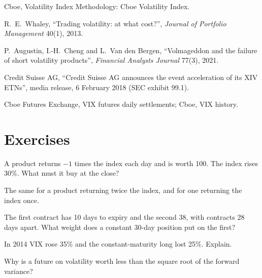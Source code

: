 \begin{omsources}
\item Cboe, Volatility Index Methodology: Cboe Volatility Index.
\item R.~E.~Whaley, ``Trading volatility: at what cost?'', \emph{Journal of Portfolio Management} 40(1), 2013.
\item P.~Augustin, I.-H.~Cheng and L.~Van den Bergen, ``Volmageddon and the failure of short volatility products'', \emph{Financial Analysts Journal}
77(3), 2021.
\item Credit Suisse AG, ``Credit Suisse AG announces the event acceleration of its XIV ETNs'', media release, 6 February 2018 (SEC exhibit 99.1).
\item Cboe Futures Exchange, VIX futures daily settlements; Cboe, VIX history.
\end{omsources}

\section{Exercises}

\begin{exercise}[$\star$]\label{exo:s2:the-volatility-index-complex:1}
A product returns $-1$ times the index each day and is worth 100. The index rises 30\%. What must it buy at the close?
\end{exercise}

\begin{exercise}[$\star$]\label{exo:s2:the-volatility-index-complex:2}
The same for a product returning twice the index, and for one returning the index once.
\end{exercise}

\begin{exercise}[$\star$]\label{exo:s2:the-volatility-index-complex:3}
The first contract has 10 days to expiry and the second 38, with contracts 28 days apart. What weight does a constant 30-day position put on the first?
\end{exercise}

\begin{exercise}[$\star\star$]\label{exo:s2:the-volatility-index-complex:4}
In 2014 VIX rose 35\% and the constant-maturity long lost 25\%. Explain.
\end{exercise}

\begin{exercise}[$\star\star$]\label{exo:s2:the-volatility-index-complex:5}
Why is a future on volatility worth less than the square root of the forward variance?
\end{exercise}

